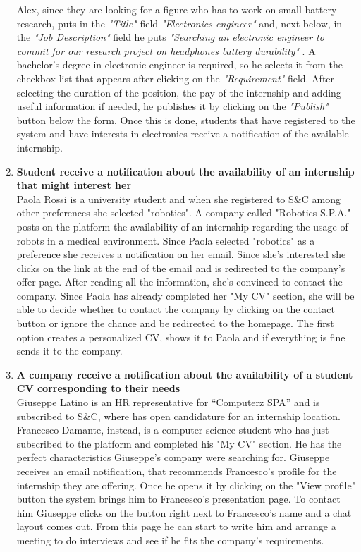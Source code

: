 \begin{enumerate}
    Alex, since they are looking for a figure who has to work on small battery research, puts in the \textit{"Title"} field \textit{"Electronics engineer"} and, next below, in the \textit{"Job Description"} field he puts \textit{"Searching an electronic engineer to commit for our research project on headphones battery durability"} .
    A bachelor's degree in electronic engineer is required, so he selects it from the checkbox list that appears after clicking on the \textit{"Requirement"} field.
    After selecting the duration of the position, the pay of the internship and adding useful information if needed, he publishes it by clicking on the \textit{"Publish"} button below the form. Once this is done, students that have registered to the system and have interests in electronics receive a notification of the available internship.
    
    
      \item \textbf{Student receive a notification about the availability of an internship that might interest her}\\
       Paola Rossi is a university student and when she registered to S\&C among other preferences she selected "robotics". A company called "Robotics S.P.A." posts on the platform the availability of an internship regarding the usage of robots in a medical environment. Since Paola selected "robotics" as a preference she receives a notification on her email. Since she's interested she clicks on the link at the end of the email and is redirected to the company's offer page. After reading all the information, she's convinced to contact the company.
       Since Paola has already completed her "My CV" section, she will be able to decide whether to contact the company by clicking on the contact button or ignore the chance and be redirected to the homepage. The first option creates a personalized CV, shows it to Paola and if everything is fine sends it to the company. 
      
      
      \item \textbf{A company receive a notification about the availability of a student CV corresponding to their needs}\\
      Giuseppe Latino is an HR representative for “Computerz SPA” and is subscribed to S\&C, where has open candidature for an internship location. Francesco Damante, instead, is a computer science student who has just subscribed to the platform and completed his "My CV" section. He has the perfect characteristics Giuseppe’s company were searching for. Giuseppe receives an email notification, that recommends Francesco's profile for the internship they are offering. Once he opens it by clicking on the "View profile" button the system brings him to Francesco’s presentation page. To contact him Giuseppe clicks on the button right next to Francesco’s name and a chat layout comes out. From this page he can start to write him and arrange a meeting to do interviews and see if he fits the company’s requirements.
      

\end{enumerate}
